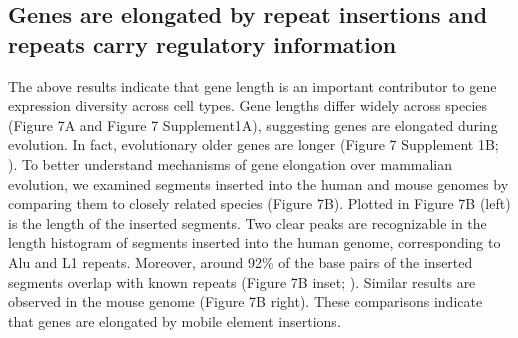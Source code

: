 \subsection{Genes are elongated by repeat insertions and repeats carry regulatory information}

The above results indicate that gene length is an important contributor to gene expression diversity across cell types. Gene lengths differ widely across species (Figure 7A and Figure 7 Supplement1A), suggesting genes are elongated during evolution. In fact, evolutionary older genes are longer (Figure 7 Supplement 1B; \cite{Grishkevich_2014}). To better understand mechanisms of gene elongation over mammalian evolution, we examined segments inserted into the human and mouse genomes by comparing them to closely related species (Figure 7B). Plotted in Figure 7B (left) is the length of the inserted segments. Two clear peaks are recognizable in the length histogram of segments inserted into the human genome, corresponding to Alu and L1 repeats. Moreover, around 92\% of the base pairs of the inserted segments overlap with known repeats (Figure 7B inset; \cite{Hubley_2015}). Similar results are observed in the mouse genome (Figure 7B right). These comparisons indicate that genes are elongated by mobile element insertions. 

